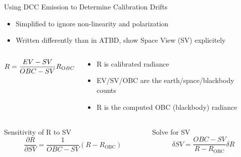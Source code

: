 \documentclass[10pt,t]{beamer}
\begin{document}
\begin{frame}[label={sec:orgd21ecfb},shrink=20]{Using DCC Emission to Determine Calibration Drifts}
\begin{itemize}
\item Simplified to ignore non-linearity and polarization
\item Written differently than in ATBD, show Space View (SV) explicitely
\end{itemize}

\vspace{-0.2in}

\begin{columns}
\begin{column}{0.3\columnwidth}
\begin{block}{}
\vspace{-0.12in}
\begin{equation}
R = \frac{EV - SV}{OBC - SV} R_{\text OBC}
\nonumber
\end{equation}
\end{block}
\end{column}

\begin{column}{0.9\columnwidth}
\begin{block}{}
\vspace{-0.12in}
\begin{itemize}
\item R is calibrated radiance
\item EV/SV/OBC are the earth/space/blackbody counts
\item R\textsubscript{} is the computed OBC (blackbody) radiance
\end{itemize}
\end{block}
\end{column}
\end{columns}



\begin{columns}
\begin{column}{0.55\columnwidth}
\begin{block}{Sensitivity of R to SV}
\vspace{0.1in}
\begin{equation}
\frac{\partial R}{\partial SV} = \frac{1}{OBC - SV} (R - R_{\text{OBC}})
\nonumber
\end{equation}
\end{block}
\end{column}

\begin{column}{0.55\columnwidth}
\begin{block}{Solve for SV}
\vspace{0.1in}
\begin{equation}
\delta SV = \frac{OBC - SV}{R - R_{\text{OBC}}} \delta R
\nonumber
\end{equation}
\end{block}
\end{column}
\end{columns}






\end{frame}
\end{document}
